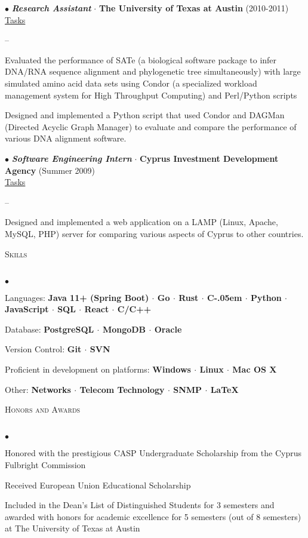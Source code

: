 \documentclass[11pt]{article}
\newcommand{\Csharp}{%
  {\settoheight{\dimen0}{C}C\kern-.05em \resizebox{!}{\dimen0}{\raisebox{\depth}{\#}}}}
\newcommand{\lineunder}{\vspace*{-8pt} \\ \hspace*{-18pt} \hrulefill \\}
\newcommand{\header}[1]{{\hspace*{-15pt}\vspace*{6pt} \textsc{#1}} \vspace*{-6pt} \lineunder}
\newcommand{\employer}[3]{{ \textbf{\emph{#1}} $\cdot$ \textbf{#2} (#3)\\ \vspace{1mm}  }}
\newenvironment{achievements}
{
  \begin{list}{$\bullet$}{\topsep 0pt \itemsep -2pt}}{\vspace*{4pt}\end{list}
}
\newenvironment{tasks}
{
  \underline{Tasks} \vspace{1mm} \begin{list}{--}{\topsep 0pt \itemsep -2pt}}{\vspace*{4pt}\end{list}
}
\begin{document}
\hspace*{-12pt}$\bullet$
\employer{Research Assistant}{The University of Texas at Austin}{2010-2011}
\begin{tasks}
  \item Evaluated the performance of SATe (a biological software package to infer DNA/RNA sequence alignment and phylogenetic tree simultaneously) with large simulated amino acid data sets using Condor (a specialized workload management system for High Throughput Computing) and Perl/Python scripts
  \item Designed and implemented a Python script that used Condor and DAGMan (Directed Acyclic Graph Manager) to evaluate and compare the performance of various DNA alignment software.
\end{tasks}


\hspace*{-12pt}$\bullet$
\employer{Software Engineering Intern}{Cyprus Investment Development Agency}{Summer 2009}
\begin{tasks}
  \item Designed and implemented a web application on a LAMP (Linux, Apache, MySQL, PHP) server for comparing various aspects of Cyprus to other countries.
\end{tasks}


\header{Skills}
\begin{achievements}
  \item Languages: \textbf{Java 11+ (Spring Boot)  $\cdot$ Go  $\cdot$ Rust $\cdot$ \Csharp $\cdot$ Python $\cdot$ JavaScript $\cdot$ SQL $\cdot$ React
    $\cdot$ C/C++ }
  \item Database: \textbf{PostgreSQL  $\cdot$ MongoDB  $\cdot$  Oracle}
  \item Version Control: \textbf{Git $\cdot$ SVN }
  \item Proficient in development on platforms: \textbf{Windows $\cdot$ Linux $\cdot$ Mac OS X}
  \item Other: \textbf{Networks $\cdot$ Telecom Technology $\cdot$ SNMP $\cdot$ \LaTeX}
\end{achievements}

\newpage

\header{Honors and Awards}
\begin{achievements}
  \item Honored with the prestigious CASP Undergraduate Scholarship from the Cyprus Fulbright Commission
  \item Received European Union Educational Scholarship
  \item Included in the Dean's List of Distinguished Students for 3 semesters and awarded with honors for academic excellence for 5 semesters (out of 8 semesters) at The University of Texas at Austin
\end{achievements}
\end{document}
